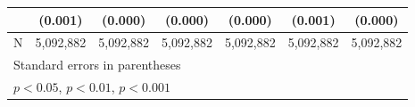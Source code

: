 {\begin{tabular}{l*{6}{c}}
                    &     (0.001)         &     (0.000)         &     (0.000)         &     (0.000)         &     (0.001)         &     (0.000)         \\
\hline
N                   &   5,092,882         &   5,092,882         &   5,092,882         &   5,092,882         &   5,092,882         &   5,092,882         \\
\hline\hline
\multicolumn{7}{l}{\footnotesize Standard errors in parentheses}\\
\multicolumn{7}{l}{\footnotesize \sym{*} \(p<0.05\), \sym{**} \(p<0.01\), \sym{***} \(p<0.001\)}\\
\end{tabular}
}
